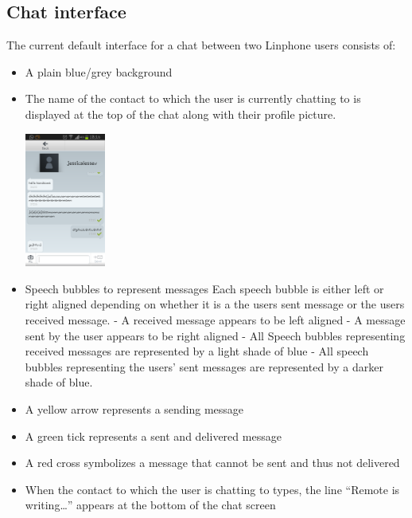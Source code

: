 \documentclass[11pt]{article}
\begin{document}
\subsection{Chat interface}
The current default interface for a chat between two Linphone users consists of:
\begin{itemize}
\item	A plain blue/grey background
\item	The name of the contact to which the user is currently chatting to is displayed at the top of the chat along with their profile picture.
\centerline{\includegraphics[width=100px]{screen.png}}
\item	Speech bubbles to represent messages
\subitem	Each speech bubble is either left or right aligned depending on whether it is a the users sent message or the users received message.
\subitem	- A received message appears to be left aligned
\subitem	- A message sent by the user appears to be right aligned
\subitem	- All Speech bubbles representing received messages are represented by a light shade of blue
\subitem	- All speech bubbles representing the users’ sent messages are represented by a darker shade of blue.
\item	A yellow arrow represents a sending message
\item	A green tick represents a sent and delivered message
\item	A red cross symbolizes a message that cannot be sent and thus not delivered
\item	When the contact to which the user is chatting to types, the line “Remote is writing…” appears at the bottom of the chat screen

\end{itemize}
\end{document}
